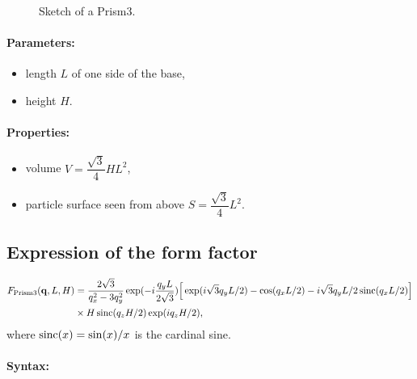 \begin{figure}[ht]
\begin{center}
\caption{Sketch of a Prism3.}
\end{center}
\label{prism3}
\end{figure}

\paragraph{Parameters:}
\begin{itemize}
\item length $L$ of one side of the base, 
\item height $H$.
\end{itemize}

\paragraph{Properties:}
\begin{itemize}
\item volume $V= \dfrac{\sqrt{3}}{4} H L^2$,
\item particle surface seen from above $S =\dfrac{\sqrt{3}}{4}L^2$.
\end{itemize}

\subsection{Expression of the form factor}
\begin{align*}
F_{\rm{Prism3}}(\mathbf{q},L, H) &= \frac{2 \sqrt{3}}{q_x^2-3q_y^2} \exp(-i \frac{q_y
      L}{2\sqrt{3}})\Big[\exp(i \sqrt{3} q_y L/2 )
    -\cos(q_x L/2)-i \sqrt{3} q_y L/2 \operatorname{sinc}(q_x L/2) \Big] \\
   &\times  H \operatorname{sinc}(q_z H/2 ) \exp(i q_z H/2),
\end{align*}
where $\operatorname{sinc}(x)=\sin(x)/x$ is the cardinal sine.


\paragraph{Syntax:}  

